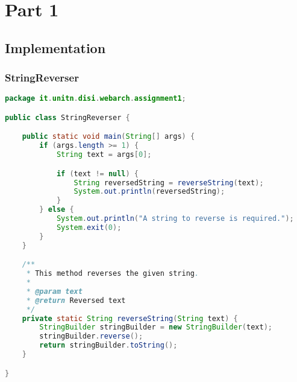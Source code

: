 \section{Part 1}

\subsection{Implementation}

\subsubsection{StringReverser}

\begin{lstlisting}[label=lst:01_part1_impl_stringreverser_code, caption=\texttt{StringReverser} class implementation, language=java]
package it.unitn.disi.webarch.assignment1;

public class StringReverser {

    public static void main(String[] args) {
        if (args.length >= 1) {
            String text = args[0];

            if (text != null) {
                String reversedString = reverseString(text);
                System.out.println(reversedString);
            }
        } else {
            System.out.println("A string to reverse is required.");
            System.exit(0);
        }
    }

    /**
     * This method reverses the given string.
     *
     * @param text
     * @return Reversed text
     */
    private static String reverseString(String text) {
        StringBuilder stringBuilder = new StringBuilder(text);
        stringBuilder.reverse();
        return stringBuilder.toString();
    }

}
\end{lstlisting}

\newpage
